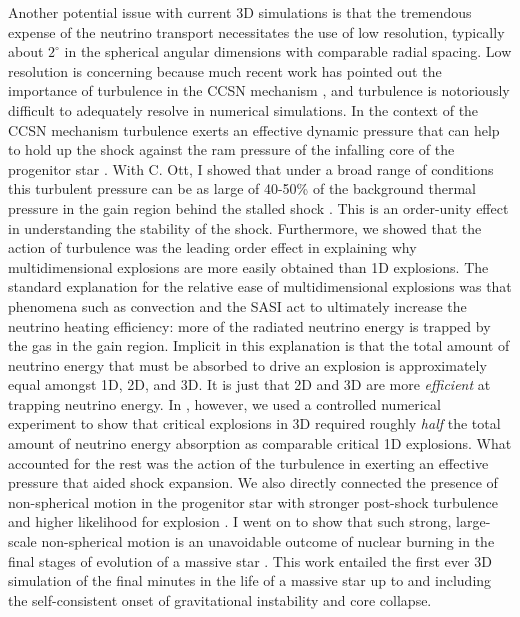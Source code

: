 Another potential issue with current 3D simulations is that the tremendous expense of the neutrino transport necessitates the use of low resolution, typically about $2^\circ$ in the spherical angular dimensions with comparable radial spacing.
Low resolution is concerning because much recent work has pointed out the importance of turbulence in the CCSN mechanism \citep{Murphy:2011a, Hanke:2012, Couch:2013a, Murphy:2013, Couch:2013b, Couch:2015, Melson:2015a, Couch:2015a, Abdikamalov:2015, Radice:2015a}, and turbulence is notoriously difficult to adequately resolve in numerical simulations.
In the context of the CCSN mechanism turbulence exerts an effective dynamic pressure that can help to hold up the shock against the ram pressure of the infalling core of the progenitor star \citep{Murphy:2013}.
With C. Ott, I showed that under a broad range of conditions this turbulent pressure can be as large of 40-50\% of the background thermal pressure in the gain region behind the stalled shock \citep{Couch:2015}.
This is an order-unity effect in understanding the stability of the shock.
Furthermore, we showed that the action of turbulence was the leading order effect in explaining why multidimensional explosions are more easily obtained than 1D explosions.
The standard explanation for the relative ease of multidimensional explosions \citep[e.g.,][]{Janka:2012a} was that phenomena such as convection and the SASI act to ultimately increase the neutrino heating efficiency: more of the radiated neutrino energy is trapped by the gas in the gain region.
Implicit in this explanation is that the total amount of neutrino energy that must be absorbed to drive an explosion is approximately equal amongst 1D, 2D, and 3D.
It is just that 2D and 3D are more {\it efficient} at trapping neutrino energy.
In \citet{Couch:2015}, however, we used a controlled numerical experiment to show that critical explosions in 3D required roughly {\it half} the total amount of neutrino energy absorption as comparable critical 1D explosions.
What accounted for the rest was the action of the turbulence in exerting an effective pressure that aided shock expansion.
We also directly connected the presence of non-spherical motion in the progenitor star with stronger post-shock turbulence and higher likelihood for explosion \citep{Couch:2013b}.
I went on to show that such strong, large-scale non-spherical motion is an unavoidable outcome of nuclear burning in the final stages of evolution of a massive star \citep{Couch:2015a}.
This work entailed the first ever 3D simulation of the final minutes in the life of a massive star up to and including the self-consistent onset of gravitational instability and core collapse.

